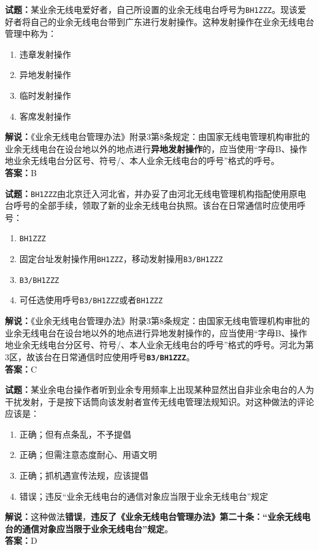 \documentclass{ctexbook}
\begin{document}
\bigskip


\noindent\textbf{试题：}某业余无线电爱好者，自己所设置的业余无线电台呼号为\texttt{BH1ZZZ}。现该爱好者将自己的业余无线电台带到广东进行发射操作。这种发射操作在业余无线电台管理中称为：
\begin{enumerate}[leftmargin=3em]
	\item 违章发射操作
	\item 异地发射操作
	\item 临时发射操作
	\item 客席发射操作
\end{enumerate}
\noindent\textbf{解说：}《业余无线电台管理办法》附录3第8条规定：由国家无线电管理机构审批的业余无线电台在设台地以外的地点进行\textbf{异地发射操作}的，应当使用“字母B、操作地业余无线电台分区号、符号/、本人业余无线电台的呼号”格式的呼号。\\\noindent\textbf{答案：}B





\bigskip


\noindent\textbf{试题：}\texttt{BH1ZZZ}由北京迁入河北省，并办妥了由河北无线电管理机构指配使用原电台呼号的全部手续，领取了新的业余无线电台执照。该台在日常通信时应使用呼号：
\begin{enumerate}[leftmargin=3em]
	\item \texttt{BH1ZZZ}
	\item 固定台址发射操作用\texttt{BH1ZZZ}，移动发射操用\texttt{B3/BH1ZZZ}
	\item \texttt{B3/BH1ZZZ}
	\item 可任选使用呼号\texttt{B3/BH1ZZZ}或者\texttt{BH1ZZZ}
\end{enumerate}
\noindent\textbf{解说：}《业余无线电台管理办法》附录3第8条规定：由国家无线电管理机构审批的业余无线电台在设台地以外的地点进行异地发射操作的，应当使用“字母B、操作地业余无线电台分区号、符号/、本人业余无线电台的呼号”格式的呼号。河北为第3区，故该台在日常通信时应使用呼号\texttt{\textbf{B3/BH1ZZZ}}。\\\noindent\textbf{答案：}C



\bigskip


\noindent\textbf{试题：}某业余电台操作者听到业余专用频率上出现某种显然出自非业余电台的人为干扰发射，于是按下话筒向该发射者宣传无线电管理法规知识。对这种做法的评论应该是：
\begin{enumerate}[leftmargin=3em]
	\item 正确；但有点条乱，不予提倡
	\item 正确；但需注意态度耐心、用语文明
	\item 正确；抓机遇宣传法规，应该提倡
	\item 错误；违反“业余无线电台的通信对象应当限于业余无线电台”规定
\end{enumerate}
\noindent\textbf{解说：}这种做法\textbf{错误}，\textbf{违反了《业余无线电台管理办法》第二十条：“业余无线电台的通信对象应当限于业余无线电台”规定}。\\\noindent\textbf{答案：}D
\end{document}
